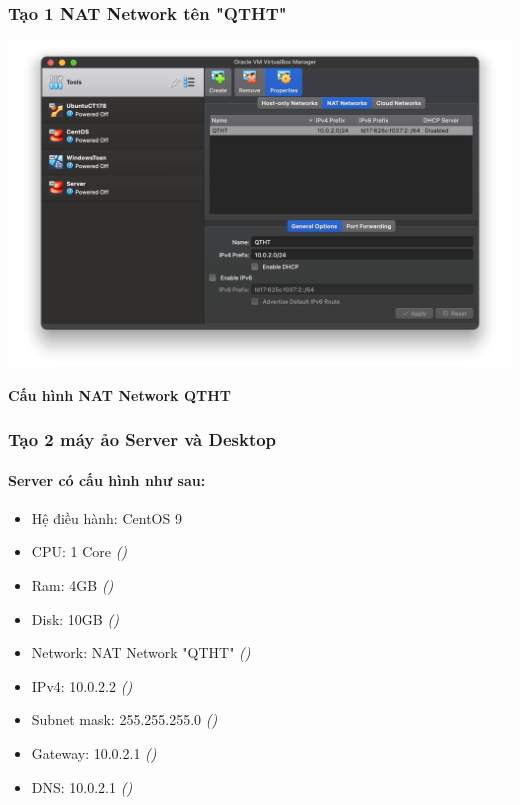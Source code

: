 \subsubsection{Tạo 1 NAT Network tên "QTHT"}

\begin{minipage}{.93\linewidth}
  \captionsetup{type=figure, skip=-15pt}
  \includegraphics[width=\linewidth]{./imgs/Hinh-2.png}
  \caption{\bfseries Cấu hình NAT Network QTHT}
\end{minipage}

\subsubsection{Tạo 2 máy ảo Server và Desktop}

\paragraph{Server có cấu hình như sau:}

\begin{itemize}
  \item Hệ điều hành: CentOS 9
  \item CPU: 1 Core \textit{()}
  \item Ram: 4GB \textit{()}
  \item Disk: 10GB \textit{()}
  \item Network: NAT Network "QTHT" \textit{()}
  \item IPv4: 10.0.2.2 \textit{()}
  \item Subnet mask: 255.255.255.0 \textit{()}
  \item Gateway: 10.0.2.1 \textit{()}
  \item DNS: 10.0.2.1 \textit{()}
\end{itemize}





